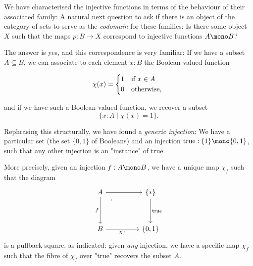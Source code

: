 \begin{node}
%
We have characterised the injective functions in terms of the behaviour
of their associated family: A natural next question to ask if there is
an object of the category of sets to serve as the \emph{codomain} for
these families: Is there some object \(X\) such that the maps \(p : B
\to X\) correspond to injective functions \(A \mono
B\)?

The answer is yes, and this correspondence is very familiar: If we have
a subset \(A \subseteq B\), we can associate to each element \(x : B\)
the Boolean-valued function

\begin{equation*}
  \chi(x) = \begin{cases*}
    1 & if $x \in A$ \\
    0 & otherwise,
  \end{cases*}
\end{equation*}

and if we have such a Boolean-valued function, we recover a subset
\[
\{x : A \mid \chi(x) = 1\}.
\]
%
\end{node}

\begin{node}
%
Rephrasing this structurally, we have found a \emph{generic injection}: We have a particular
set (the set \(\{0,1\}\) of Booleans) and an injection \(\mathrm{true} :
\{1\} \mono \{0,1\}\), such that any other injection is an "instance" of
\(\mathrm{true}\).
%
\end{node}

\begin{node}
%
More precisely, given an injection \(f : A \mono B\), we have a unique
map \(\chi_f\) such that the diagram
\[\begin{tikzcd}
  A && {\{*\}} \\
  \\
  B && {\{0,1\}}
  \arrow["{\mathrm{true}}", from=1-3, to=3-3]
  \arrow["{\chi_f}"', from=3-1, to=3-3]
  \arrow["f"', from=1-1, to=3-1]
  \arrow[from=1-1, to=1-3]
  \arrow["\lrcorner"{anchor=center, pos=0.125}, draw=none, from=1-1, to=3-3]
\end{tikzcd}\] is a pullback square, as indicated: given \emph{any}
injection, we have a specific map \(\chi_f\) such that the fibre of
\(\chi_f\) over "true" recovers the subset \(A\).
%
\end{node}


